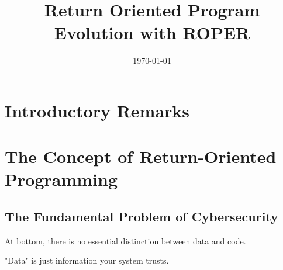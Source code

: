 \documentclass[11pt]{article}
\date{\today}
\title{Return Oriented Program Evolution with ROPER}
\begin{document}
\maketitle
\setcounter{tocdepth}{1}
\tableofcontents


\section*{}
\label{sec:orge4c8563}

\section*{Introductory Remarks}
\label{sec:orgb3a58ba}
\section*{The Concept of Return-Oriented Programming}
\label{sec:orgdb9113f}
\subsection*{The Fundamental Problem of Cybersecurity}
\label{sec:orgab4ab0a}
At bottom, there is no essential distinction between data and code.

"Data" is just information your system trusts. 
\end{document}
